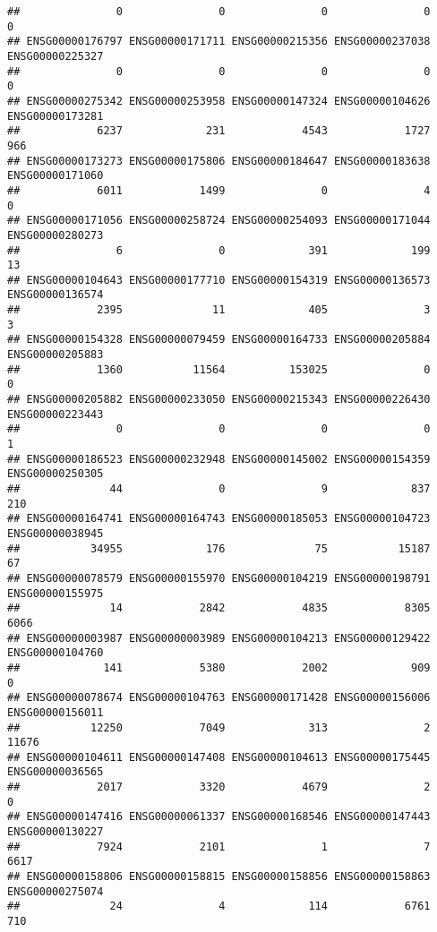 \documentclass[
]{article}
\begin{document}
\begin{verbatim}
##               0               0               0               0               0 
## ENSG00000176797 ENSG00000171711 ENSG00000215356 ENSG00000237038 ENSG00000225327 
##               0               0               0               0               0 
## ENSG00000275342 ENSG00000253958 ENSG00000147324 ENSG00000104626 ENSG00000173281 
##            6237             231            4543            1727             966 
## ENSG00000173273 ENSG00000175806 ENSG00000184647 ENSG00000183638 ENSG00000171060 
##            6011            1499               0               4               0 
## ENSG00000171056 ENSG00000258724 ENSG00000254093 ENSG00000171044 ENSG00000280273 
##               6               0             391             199              13 
## ENSG00000104643 ENSG00000177710 ENSG00000154319 ENSG00000136573 ENSG00000136574 
##            2395              11             405               3               3 
## ENSG00000154328 ENSG00000079459 ENSG00000164733 ENSG00000205884 ENSG00000205883 
##            1360           11564          153025               0               0 
## ENSG00000205882 ENSG00000233050 ENSG00000215343 ENSG00000226430 ENSG00000223443 
##               0               0               0               0               1 
## ENSG00000186523 ENSG00000232948 ENSG00000145002 ENSG00000154359 ENSG00000250305 
##              44               0               9             837             210 
## ENSG00000164741 ENSG00000164743 ENSG00000185053 ENSG00000104723 ENSG00000038945 
##           34955             176              75           15187              67 
## ENSG00000078579 ENSG00000155970 ENSG00000104219 ENSG00000198791 ENSG00000155975 
##              14            2842            4835            8305            6066 
## ENSG00000003987 ENSG00000003989 ENSG00000104213 ENSG00000129422 ENSG00000104760 
##             141            5380            2002             909               0 
## ENSG00000078674 ENSG00000104763 ENSG00000171428 ENSG00000156006 ENSG00000156011 
##           12250            7049             313               2           11676 
## ENSG00000104611 ENSG00000147408 ENSG00000104613 ENSG00000175445 ENSG00000036565 
##            2017            3320            4679               2               0 
## ENSG00000147416 ENSG00000061337 ENSG00000168546 ENSG00000147443 ENSG00000130227 
##            7924            2101               1               7            6617 
## ENSG00000158806 ENSG00000158815 ENSG00000158856 ENSG00000158863 ENSG00000275074 
##              24               4             114            6761             710 

\end{verbatim}
\end{document}
